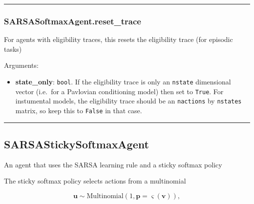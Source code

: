 \begin{center}\rule{0.5\linewidth}{\linethickness}\end{center}

\subsubsection{SARSASoftmaxAgent.reset\_trace}\label{sarsasoftmaxagent.reset_trace}

\begin{Shaded}
\begin{Highlighting}[]
\OperatorTok{=}\NormalTok{)}
\end{Highlighting}
\end{Shaded}

For agents with eligibility traces, this resets the eligibility trace
(for episodic tasks)

Arguments:

\begin{itemize}
\tightlist
\item
  \textbf{state\_only}: \texttt{bool}. If the eligibility trace is only
  an \texttt{nstate} dimensional vector (i.e.~for a Pavlovian
  conditioning model) then set to \texttt{True}. For instumental models,
  the eligibility trace should be an \texttt{nactions} by
  \texttt{nstates} matrix, so keep this to \texttt{False} in that case.
\end{itemize}

\begin{center}\rule{0.5\linewidth}{\linethickness}\end{center}

\subsection{SARSAStickySoftmaxAgent}\label{sarsastickysoftmaxagent}

\begin{Shaded}
\begin{Highlighting}[]
\end{Highlighting}
\end{Shaded}

An agent that uses the SARSA learning rule and a sticky softmax policy

The sticky softmax policy selects actions from a multinomial

\[
\mathbf u \sim \mathrm{Multinomial}(1, \mathbf p=\varsigma(\mathbf v)),
\]

